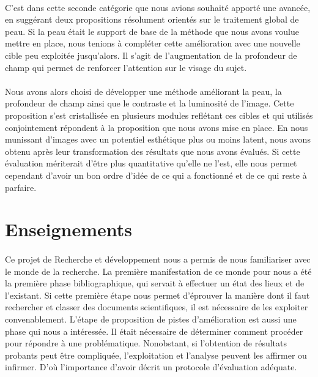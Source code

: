 \documentclass[11pt, french,screen]{report-rd-info}
\begin{document}
\paragraph*{}
C'est dans cette seconde catégorie que nous avions souhaité apporté une avancée, en suggérant deux propositions résolument orientés sur le traitement global de peau. Si la peau était le support de base de la méthode que nous avons voulue mettre en place, nous tenions à compléter cette amélioration avec une nouvelle cible peu exploitée jusqu'alors. Il s'agit de l'augmentation de la profondeur de champ qui permet de renforcer l'attention sur le visage du sujet.
\paragraph*{}
Nous avons alors choisi de développer une méthode améliorant la peau, la profondeur de champ ainsi que le contraste et la luminosité de l'image. Cette proposition s'est cristallisée en plusieurs modules reflétant ces cibles et qui utilisés conjointement répondent à la proposition que nous avons mise en place. En nous munissant d'images avec un potentiel esthétique plus ou moins latent, nous avons obtenu après leur transformation des résultats que nous avons évalués. Si cette évaluation mériterait d'être plus quantitative qu'elle ne l'est, elle nous permet cependant d'avoir un bon ordre d'idée de ce qui a fonctionné et de ce qui reste à parfaire.

\section{Enseignements}
\paragraph*{}
Ce projet de Recherche et développement nous a permis de nous familiariser avec le monde de la recherche. La première manifestation de ce monde pour nous a été la première phase bibliographique, qui servait à effectuer un état des lieux et de l'existant. Si cette première étape nous permet d'éprouver la manière dont il faut rechercher et classer des documents scientifiques, il est nécessaire de les exploiter convenablement. L'étape de proposition de pistes d'amélioration est aussi une phase qui nous a intéressée. Il était nécessaire de déterminer comment procéder pour répondre à une problématique. Nonobstant, si l'obtention de résultats probants peut être compliquée, l'exploitation et l'analyse peuvent les affirmer ou infirmer. D'où l'importance d'avoir décrit un protocole d'évaluation adéquate.
\end{document}
